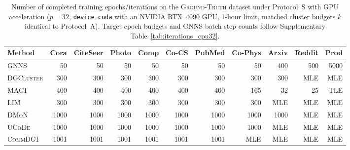 \documentclass[11pt,a4paper]{article}
\begin{document}
\begin{table}[H]
    \centering
    \caption{Number of completed training epochs/iterations on the \textsc{Ground-Truth} dataset under Protocol~S with GPU acceleration ($p=32$, \texttt{device=cuda} with an NVIDIA RTX~4090 GPU, 1-hour limit, matched cluster budgets $k$ identical to Protocol~A). Target epoch budgets and \textsc{GNNS} batch step counts follow Supplementary Table~\ref{tab:iterations_cpu32}.}
    \label{tab:iterations_gpu}
    \vspace{0.5em}
    \small
    \setlength{\tabcolsep}{3.5pt}
    \begin{tabular*}{\textwidth}{@{\extracolsep{\fill}}l rrrrrrrrrr@{}}
        \toprule
        Method             & Cora & CiteSeer & Photo & Comp & Co-CS & PubMed & Co-Phys & Arxiv & Reddit & Prod \\
        \midrule
        \textsc{GNNS}      & 50   & 50       & 50    & 50   & 50    & 50     & 50      & 400   & 500    & 5000 \\
        \textsc{DGCluster} & 300  & 300      & 300   & 300  & 300   & 300    & 300     & 300   & MLE    & MLE \\
        \textsc{MAGI}      & 400  & 400      & 400   & 400  & 400   & 400    & 165     & 32    & 25     & TLE \\
        \textsc{LIM}       & 300  & 300      & 300   & 300  & 300   & 300    & 300     & MLE   & MLE    & MLE \\
        \textsc{DMoN}      & 1000 & 1000     & 1000  & 1000 & 1000  & 1000   & 1000    & 1000  & MLE    & MLE \\
        \textsc{UCoDe}     & 1000 & 1000     & 1000  & 1000 & 1000  & 1000   & 1000    & MLE   & MLE    & MLE \\
        \textsc{CommDGI}   & 1001 & 1001     & 1001  & 1001 & 1001  & 1001   & MLE     & MLE   & MLE    & MLE \\
        \bottomrule
    \end{tabular*}
\end{table}
\end{document}
